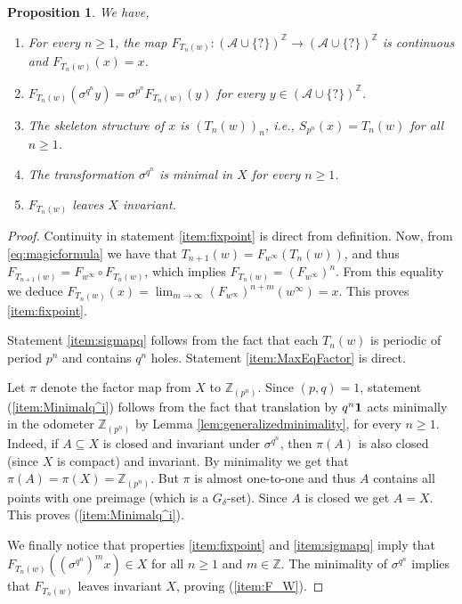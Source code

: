 \documentclass{daj}
\theoremstyle{plain}
\newtheorem{proposition}[theorem]{Proposition}
\theoremstyle{definition}
\begin{document}
\begin{proposition}\label{prop:basicproperties} We have, 
	\begin{enumerate} 
		\item \label{item:fixpoint} For every $n\geq 1$, the map $F_{T_n(w)}\colon (\mathcal{A}\cup \{?\})^{\mathbb{Z}}\to (\mathcal{A}\cup \{?\})^{\mathbb{Z}}$ is continuous and $F_{{T_n(w)}}(x)=x$.  
		\item \label{item:sigmapq} $F_{{T_n(w)}}(\sigma^{q^n} y)=\sigma^{p^n}F_{{T_n(w)}}(y)$ for every $y\in (\mathcal{A}\cup \{?\})^{\mathbb{Z}}$.
		\item \label{item:MaxEqFactor} The skeleton structure of $x$ is $(T_n(w))_n$, {\em i.e.,} $S_{p^n}(x) = T_{n}(w)$ for all $n\geq 1$. 
		\item \label{item:Minimalq^i} The transformation $\sigma^{q^n}$ is minimal in $X$ for every $n\geq 1$.
		\item \label{item:F_W} $F_{T_n(w)}$ leaves $X$ invariant. 
	\end{enumerate}
\end{proposition}
\begin{proof}
	Continuity in statement \eqref{item:fixpoint} is direct from definition. Now, from \eqref{eq:magicformula} we have that $T_{n+1}(w)=F_{w^{\infty}}(T_{n}(w))$, and thus $F_{T_{n+1}(w)}=F_{w^{\infty}}\circ F_{T_n(w)}$, which implies $F_{T_{n}(w)}= (F_{w^{\infty}})^{n}$. 
	From this equality we deduce $F_{T_{n}(w)}(x)=\lim_{m\to \infty} (F_{w^{\infty}})^{n+m}(w^{\infty})=x$. This proves \eqref{item:fixpoint}.
	
	Statement \eqref{item:sigmapq} follows from the fact that each $T_n(w)$ is periodic of period $p^n$ and contains $q^n$ holes. Statement \eqref{item:MaxEqFactor} is direct.
	
	Let $\pi$ denote the factor map from $X$ to $\mathbb{Z}_{(p^n)}$. 
	Since $(p,q)=1$, statement (\ref{item:Minimalq^i}) follows from the fact that translation 
	by ${q^n}{\bf 1}$ acts minimally in the odometer $\mathbb{Z}_{(p^n)}$ by Lemma \ref{lem:generalizedminimality}, for every $n\geq 1$. Indeed, if $A \subseteq X$ is closed and invariant under $\sigma^{q^n}$, 
	then $\pi(A)$ is also closed (since $X$ is compact) and invariant.  By minimality we get that $\pi(A)=\pi(X)=\mathbb{Z}_{(p^n)}$. But $\pi$ is almost one-to-one and thus $A$ contains all points with one preimage (which is a $G_{\delta}$-set). Since $A$ is closed we get $A=X$. This proves (\ref{item:Minimalq^i}).
	
	We finally notice that properties \eqref{item:fixpoint} and \eqref{item:sigmapq} 
	imply that $F_{{T_n(w)}}((\sigma^{q^n})^m x) \in X$ for all $n\geq 1$ and $m\in \mathbb{Z}$. The minimality of $\sigma^{q^n}$ implies that $F_{{T_n(w)}}$ leaves invariant $X$, proving (\ref{item:F_W}).  
\end{proof}
\end{document}
